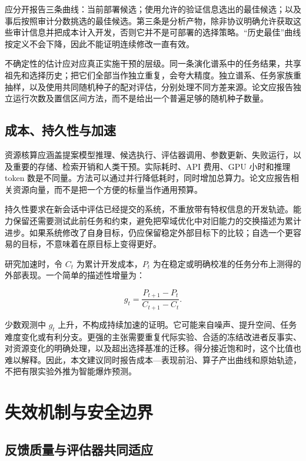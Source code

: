 \documentclass[11pt,,]{article}
\begin{document}
应分开报告三条曲线：当前部署候选；使用允许的验证信息选出的最佳候选；以及事后按照审计分数挑选的最佳候选。第三条是分析产物，除非协议明确允许获取这些审计信息并把成本计入开发，否则它并不是可部署的选择策略。``历史最佳''曲线按定义不会下降，因此不能证明连续修改一直有效。

不确定性的估计应对应真正实施干预的层级。同一条演化谱系中的任务结果，共享祖先和选择历史；把它们全部当作独立重复，会夸大精度。独立谱系、任务家族重抽样，以及使用共同随机种子的配对评估，分别处理不同方差来源。论文应报告独立运行次数及置信区间方法，而不是给出一个普遍足够的随机种子数量。

\hypertarget{ux6210ux672cux6301ux4e45ux6027ux4e0eux52a0ux901f}{%
\subsection{成本、持久性与加速}\label{ux6210ux672cux6301ux4e45ux6027ux4e0eux52a0ux901f}}

资源核算应涵盖提案模型推理、候选执行、评估器调用、参数更新、失败运行，以及重要的存储、检索开销和人类干预。实际耗时、API
费用、GPU 小时和推理 token
数是不同量。方法可以通过并行降低耗时，同时增加总算力。论文应报告相关资源向量，而不是把一个方便的标量当作通用预算。

持久性要求在新会话中评估已经提交的系统，不重放带有特权信息的开发轨迹。能力保留还需要测试此前任务和约束，避免把窄域优化中对旧能力的交换描述为累计进步。如果系统修改了自身目标，仍应保留稳定外部目标下的比较；自选一个更容易的目标，不意味着在原目标上变得更好。

研究加速时，令 \(C_t\) 为累计开发成本，\(P_t\)
为在稳定或明确校准的任务分布上测得的外部表现。一个简单的描述性增量为：

\[
 g_t=\frac{P_{t+1}-P_t}{C_{t+1}-C_t}.
\]

少数观测中 \(g_t\)
上升，不构成持续加速的证明。它可能来自噪声、提升空间、任务难度变化或有利分支。更强的主张需要重复代际实验、合适的冻结改进者反事实、对资源变化的明确处理，以及超出选择基准的迁移。得分接近饱和时，这个比值也难以解释。因此，本文建议同时报告成本---表现前沿、算子产出曲线和原始轨迹，不把有限实验外推为智能爆炸预测。

\hypertarget{ux5931ux6548ux673aux5236ux4e0eux5b89ux5168ux8fb9ux754c}{%
\section{失效机制与安全边界}\label{ux5931ux6548ux673aux5236ux4e0eux5b89ux5168ux8fb9ux754c}}

\hypertarget{ux53cdux9988ux8d28ux91cfux4e0eux8bc4ux4f30ux5668ux5171ux540cux9002ux5e94}{%
\subsection{反馈质量与评估器共同适应}\label{ux53cdux9988ux8d28ux91cfux4e0eux8bc4ux4f30ux5668ux5171ux540cux9002ux5e94}}
\end{document}
